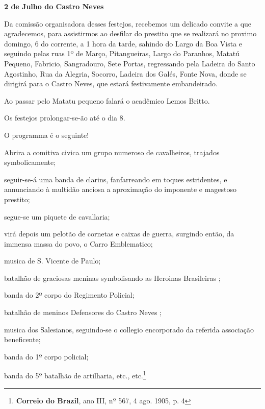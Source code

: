 \begin{citacao}
\textbf{2 de Julho do Castro Neves}

Da comissão organisadora desses festejos, recebemos um delicado convite a que agradecemos, para assistirmos ao desfilar do prestito que se realizará no proximo domingo, 6 do corrente, a 1 hora da tarde, sahindo do Largo da Boa Vista e seguindo pelas ruas 1º de Março, Pitangueiras, Largo do Paranhos, Matatú Pequeno, Fabricio, Sangradouro, Sete Portas, regressando pela Ladeira do Santo Agostinho, Rua da Alegria, Socorro, Ladeira dos Galés, Fonte Nova, donde se dirigirá para o Castro Neves, que estará festivamente embandeirado.

Ao passar pelo Matatu pequeno falará o acadêmico Lemos Britto.

Os festejos prolongar-se-ão até o dia 8.

O programma é o seguinte!

Abrira a comitiva civica um grupo numeroso de cavalheiros, trajados symbolicamente;

seguir-se-á uma banda de clarins, fanfarreando em toques estridentes, e annunciando à multidão anciosa a aproximação do imponente e magestoso prestito;

segue-se um piquete de cavallaria;

virá depois um pelotão de cornetas e caixas de guerra, surgindo então, da immensa massa do povo, o Carro Emblematico;

musica de S. Vicente de Paulo;

batalhão de graciosas meninas symbolisando as \og Heroinas Brasileiras \fg{};

banda do 2º corpo do Regimento Policial;

batalhão de meninos \og Defensores do Castro Neves \fg{};

musica dos Salesianos, seguindo-se o collegio encorporado da referida associação beneficente;

banda do 1º corpo policial;

banda do 5º batalhão de artilharia, etc., etc.\footnote{\textbf{Correio do Brazil}, ano III, nº 567, 4 ago. 1905, p. 4}
\end{citacao}

